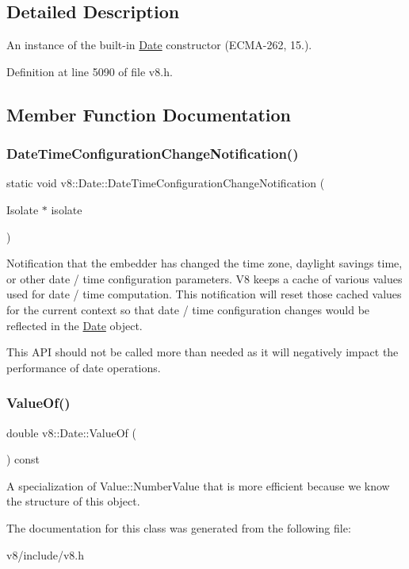 \subsection{Detailed Description}
An instance of the built-\/in \mbox{\hyperlink{classv8_1_1Date}{Date}} constructor (E\+C\+M\+A-\/262, 15.). 

Definition at line 5090 of file v8.\+h.



\subsection{Member Function Documentation}
\mbox{\label{classv8_1_1Date_adb084ec0683d3d195ad0f78af5f6f72b}} 
\subsubsection{\texorpdfstring{Date\+Time\+Configuration\+Change\+Notification()}{DateTimeConfigurationChangeNotification()}}
{\footnotesize\ttfamily static void v8\+::\+Date\+::\+Date\+Time\+Configuration\+Change\+Notification (\begin{DoxyParamCaption}\item[{Isolate $\ast$}]{isolate }\end{DoxyParamCaption})\hspace{0.3cm}{\ttfamily [static]}}

Notification that the embedder has changed the time zone, daylight savings time, or other date / time configuration parameters. V8 keeps a cache of various values used for date / time computation. This notification will reset those cached values for the current context so that date / time configuration changes would be reflected in the \mbox{\hyperlink{classv8_1_1Date}{Date}} object.

This A\+PI should not be called more than needed as it will negatively impact the performance of date operations. \mbox{\label{classv8_1_1Date_adb9d292549a173e045ee177051dbde19}} 
\subsubsection{\texorpdfstring{Value\+Of()}{ValueOf()}}
{\footnotesize\ttfamily double v8\+::\+Date\+::\+Value\+Of (\begin{DoxyParamCaption}{ }\end{DoxyParamCaption}) const}

A specialization of Value\+::\+Number\+Value that is more efficient because we know the structure of this object. 

The documentation for this class was generated from the following file\+:\begin{DoxyCompactItemize}
\item 
v8/include/v8.\+h\end{DoxyCompactItemize}
